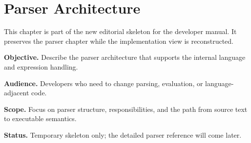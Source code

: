 \chapter{Parser Architecture}
\label{chap:parser-architecture}

This chapter is part of the new editorial skeleton for the developer manual. It preserves the parser chapter while the implementation view is reconstructed.

\noindent\textbf{Objective.} Describe the parser architecture that supports the internal language and expression handling.

\noindent\textbf{Audience.} Developers who need to change parsing, evaluation, or language-adjacent code.

\noindent\textbf{Scope.} Focus on parser structure, responsibilities, and the path from source text to executable semantics.

\noindent\textbf{Status.} Temporary skeleton only; the detailed parser reference will come later.

